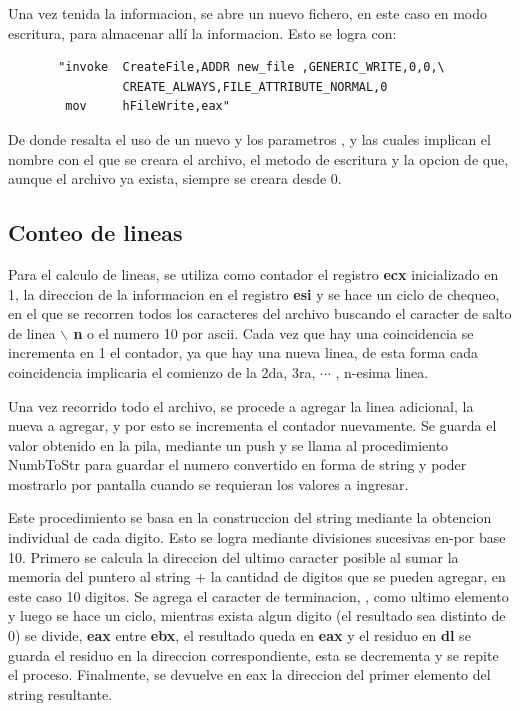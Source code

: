     Una vez tenida la informacion, se abre un nuevo fichero, en este caso en
    modo escritura, para almacenar allí la informacion. Esto se logra con:

    \begin{Verbatim}
       "invoke  CreateFile,ADDR new_file ,GENERIC_WRITE,0,0,\
                CREATE_ALWAYS,FILE_ATTRIBUTE_NORMAL,0
        mov     hFileWrite,eax"
    \end{Verbatim}

    De donde resalta el uso de un nuevo  y los parametros
    \comillas{ADDR new\_file}, \comillas{GENERIC\_WRITE} y 
    las cuales implican el nombre con el que se creara el archivo, el metodo de
    escritura y la opcion de que, aunque el archivo ya exista, siempre se creara
    desde 0.

\subsection*{Conteo de lineas}

    Para el calculo de lineas, se utiliza como contador el registro \textbf{ecx}
    inicializado en 1, la direccion de la informacion en el registro \textbf{esi}
    y se hace un ciclo de chequeo, en el que se recorren todos los caracteres
    del archivo buscando el caracter de salto de linea \textbf{$\backslash$ n} o
    el numero 10 por ascii. Cada vez que hay una coincidencia se incrementa en
    1 el contador, ya que hay una nueva linea, de esta forma cada coincidencia
    implicaria el comienzo de la 2da, 3ra, $\cdots$ , n-esima linea.

    Una vez recorrido todo el archivo, se procede a agregar la linea adicional,
    la nueva a agregar, y por esto se incrementa el contador nuevamente. Se
    guarda el valor obtenido en la pila, mediante un push y se llama al
    procedimiento NumbToStr para guardar el numero convertido en forma de string
    y poder mostrarlo por pantalla cuando se requieran los valores a ingresar.

    Este procedimiento se basa en la construccion del string mediante la obtencion
    individual de cada digito. Esto se logra mediante divisiones sucesivas en-por
    base 10. Primero se calcula la direccion del ultimo caracter posible al
    sumar la memoria del puntero al string + la cantidad de digitos que se
    pueden agregar, en este caso 10 digitos. Se agrega el caracter de terminacion,
    \comillas{0}, como ultimo elemento y luego se hace un ciclo, mientras exista
    algun digito (el resultado sea distinto de 0) se divide, \textbf{eax} entre
    \textbf{ebx}, el resultado queda en \textbf{eax} y el residuo en \textbf{dl}
    se guarda el residuo en la direccion correspondiente, esta se decrementa y se
    repite el proceso. Finalmente, se devuelve en eax la direccion del primer
    elemento del string resultante.

